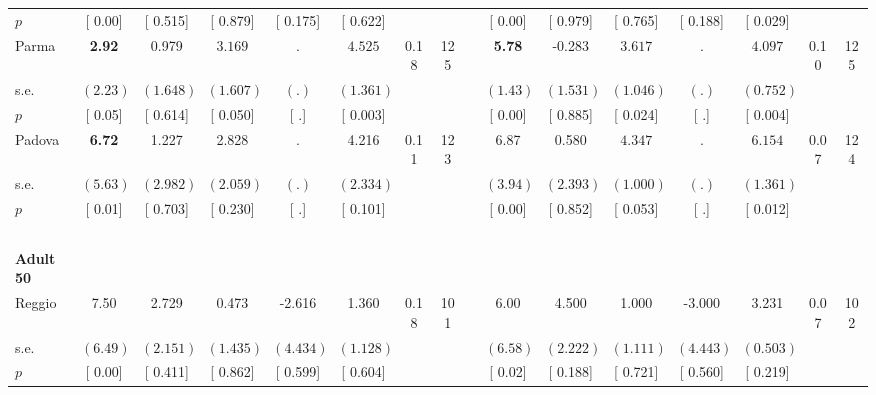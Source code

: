 \begin{longtable}{L{8em} c c c c c c c p{1em} c c c c c c c}
\quad \quad \quad \quad $ p$ & [     0.00] & [    0.515] & [    0.879] & [    0.175] & [    0.622] & & & & [     0.00] & [    0.979] & [    0.765] & [    0.188] & [    0.029] & &  \\[1em]
\quad \quad \quad Parma& \textbf{     2.92} &     0.979 & $ \mathbf{    3.169}$ &         . & $ \mathbf{    4.525}$ &      0.18 &       125 & & \textbf{     5.78} &    -0.283 & $ \mathbf{    3.617}$ &         . & $ \mathbf{    4.097}$ &      0.10 &       125  \\*
\quad \quad \quad \quad s.e.& $ (     2.23)$ & $ (    1.648)$ & $ (    1.607)$ & $ (        .)$ & $ (    1.361)$ & & & & $ (     1.43)$ & $ (    1.531)$ & $ (    1.046)$ & $ (        .)$ & $ (    0.752)$ & &  \\*
\quad \quad \quad \quad $ p$ & [     0.05] & [    0.614] & [    0.050] & [        .] & [    0.003] & & & & [     0.00] & [    0.885] & [    0.024] & [        .] & [    0.004] & &  \\[1em]
\quad \quad \quad Padova& \textbf{     6.72} &     1.227 &     2.828 &         . &     4.216 &      0.11 &       123 & & 6.87 &     0.580 & $ \mathbf{    4.347}$ &         . & $ \mathbf{    6.154}$ &      0.07 &       124  \\*
\quad \quad \quad \quad s.e.& $ (     5.63)$ & $ (    2.982)$ & $ (    2.059)$ & $ (        .)$ & $ (    2.334)$ & & & & $ (     3.94)$ & $ (    2.393)$ & $ (    1.000)$ & $ (        .)$ & $ (    1.361)$ & &  \\*
\quad \quad \quad \quad $ p$ & [     0.01] & [    0.703] & [    0.230] & [        .] & [    0.101] & & & & [     0.00] & [    0.852] & [    0.053] & [        .] & [    0.012] & &  \\[1em]
~\\[1em]
\quad \quad \textbf{Adult 50} & & & & & & & & & & & & & & & \\* 
\quad \quad \quad Reggio& 7.50 &     2.729 &     0.473 &    -2.616 &     1.360 &      0.18 &       101 & & 6.00 &     4.500 &     1.000 &    -3.000 &     3.231 &      0.07 &       102  \\*
\quad \quad \quad \quad s.e.& $ (     6.49)$ & $ (    2.151)$ & $ (    1.435)$ & $ (    4.434)$ & $ (    1.128)$ & & & & $ (     6.58)$ & $ (    2.222)$ & $ (    1.111)$ & $ (    4.443)$ & $ (    0.503)$ & &  \\*
\quad \quad \quad \quad $ p$ & [     0.00] & [    0.411] & [    0.862] & [    0.599] & [    0.604] & & & & [     0.02] & [    0.188] & [    0.721] & [    0.560] & [    0.219] & &  \\[1em]

\end{longtable}
